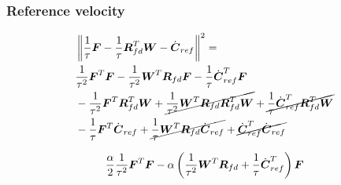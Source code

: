 \subsubsection{Reference velocity}
\begin{equation*}
\begin{split}
    &\norm{\frac{1}{\tau} \FD - \frac{1}{\tau} \M{R}_{fd}^T \V{W} - \cVel_{ref}}^2 = \\
    &
    \frac{1}{\tau^2} \FD^T \FD
    - \frac{1}{\tau^2} \V{W}^T \M{R}_{fd} \FD
    - \frac{1}{\tau} \cVel_{ref}^T \FD\\
    &
    - \frac{1}{\tau^2} \FD^T \M{R}_{fd}^T \V{W}
    + \cancel{\frac{1}{\tau^2} \V{W}^T \M{R}_{fd} \M{R}_{fd}^T \V{W}}
    + \cancel{\frac{1}{\tau} \cVel_{ref}^T \M{R}_{fd}^T \V{W}}\\
    &
    - \frac{1}{\tau} \FD^T \cVel_{ref}
    + \cancel{\frac{1}{\tau} \V{W}^T \M{R}_{fd} \cVel_{ref}}
    + \cancel{\cVel_{ref}^T \cVel_{ref}}\\
\end{split}
\end{equation*}

\begin{equation*}
    \frac{\alpha}{2} \frac{1}{\tau^2} \FD^T \FD
    -  
    \alpha 
    \left(
        \frac{1}{\tau^2} \V{W}^T \M{R}_{fd}
        +
        \frac{1}{\tau} \cVel_{ref}^T
    \right)
    \FD
\end{equation*}

